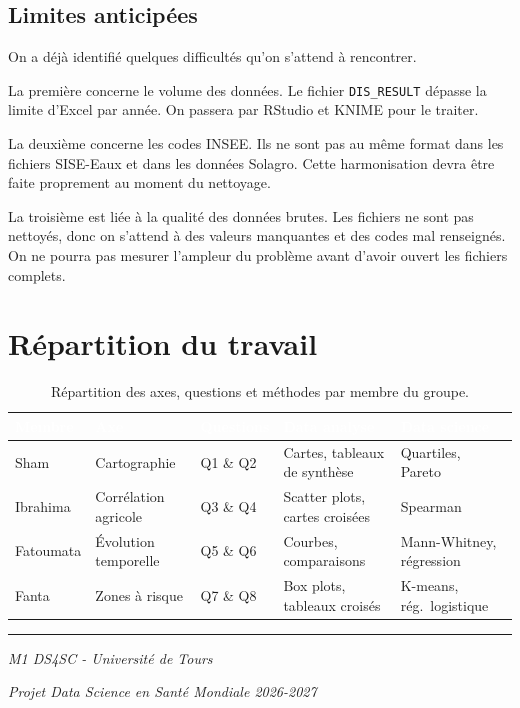 \documentclass[a4paper,11pt]{article}
\begin{document}
\subsection{Limites anticipées}

On a déjà identifié quelques difficultés qu'on s'attend à rencontrer.

La première concerne le volume des données. Le fichier \texttt{DIS\_RESULT} dépasse la limite d'Excel par année. On passera par RStudio et KNIME pour le traiter.

La deuxième concerne les codes INSEE. Ils ne sont pas au même format dans les fichiers SISE-Eaux et dans les données Solagro. Cette harmonisation devra être faite proprement au moment du nettoyage.

La troisième est liée à la qualité des données brutes. Les fichiers ne sont pas nettoyés, donc on s'attend à des valeurs manquantes et des codes mal renseignés. On ne pourra pas mesurer l'ampleur du problème avant d'avoir ouvert les fichiers complets.

\section{Répartition du travail}

\begin{table}[H]
\centering
\renewcommand{\arraystretch}{1.35}
\begin{tabularx}{\textwidth}{@{}p{2.2cm} X p{2.4cm} p{2.4cm} p{2.8cm}@{}}
\toprule
\rowcolor{utblue}
\textcolor{white}{\bfseries Membre} &
\textcolor{white}{\bfseries Axe} &
\textcolor{white}{\bfseries Questions} &
\textcolor{white}{\bfseries Data analyse} &
\textcolor{white}{\bfseries Data science} \\
\midrule
{Sham} & Cartographie & Q1 \& Q2 & Cartes, tableaux de synthèse & Quartiles, Pareto \\
{Ibrahima} & Corrélation agricole & Q3 \& Q4 & Scatter plots, cartes croisées & Spearman \\
{Fatoumata} & Évolution temporelle & Q5 \& Q6 & Courbes, comparaisons & Mann-Whitney, régression \\
{Fanta} & Zones à risque & Q7 \& Q8 & Box plots, tableaux croisés & K-means, rég.\ logistique \\
\bottomrule
\end{tabularx}
\caption{Répartition des axes, questions et méthodes par membre du groupe.}
\label{tab:repartition}
\end{table}

\vspace{2em}
\begin{center}
  \color{watercyan}\rule{6cm}{1pt}\par\vspace{0.4em}
  \color{txtgrey}\itshape\small M1 DS4SC - Université de Tours\par
  \color{txtgrey}\itshape\small Projet Data Science en Santé Mondiale 2026-2027
\end{center}
\end{document}
